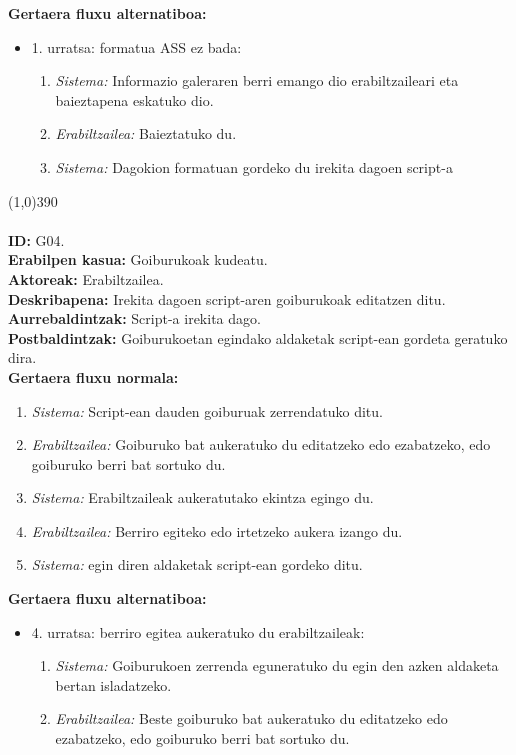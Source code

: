 \textbf{Gertaera fluxu alternatiboa:}
\begin{itemize}
	\item 1. urratsa: formatua ASS ez bada:
		\begin{enumerate}
		\item \textit{Sistema:} Informazio galeraren berri emango dio erabiltzaileari eta baieztapena eskatuko dio.
		\item \textit{Erabiltzailea:} Baieztatuko du.
		\item \textit{Sistema:} Dagokion formatuan gordeko du irekita dagoen script-a
		\end{enumerate}
\end{itemize}
\line(1,0){390}\\




\noindent\\
\textbf{ID:} G04.\\
\textbf{Erabilpen kasua:} Goiburukoak kudeatu.\\
\textbf{Aktoreak:} Erabiltzailea.\\
\textbf{Deskribapena:} Irekita dagoen script-aren goiburukoak editatzen ditu.\\
\textbf{Aurrebaldintzak:} Script-a irekita dago.\\
\textbf{Postbaldintzak:} Goiburukoetan egindako aldaketak script-ean gordeta geratuko dira.\\
\textbf{Gertaera fluxu normala:}
\begin{enumerate}
	\item \textit{Sistema:} Script-ean dauden goiburuak zerrendatuko ditu.
	\item \textit{Erabiltzailea:} Goiburuko bat aukeratuko du editatzeko edo ezabatzeko, edo goiburuko berri bat sortuko du.
	\item \textit{Sistema:} Erabiltzaileak aukeratutako ekintza egingo du.
	\item \textit{Erabiltzailea:} Berriro egiteko edo irtetzeko aukera izango du.
	\item \textit{Sistema:} egin diren aldaketak script-ean gordeko ditu.
\end{enumerate}
\textbf{Gertaera fluxu alternatiboa:}
\begin{itemize}
	\item 4. urratsa: berriro egitea aukeratuko du erabiltzaileak:
		\begin{enumerate}
		\item \textit{Sistema:} Goiburukoen zerrenda eguneratuko du egin den azken aldaketa bertan isladatzeko.
		\item \textit{Erabiltzailea:} Beste goiburuko bat aukeratuko du editatzeko edo ezabatzeko, edo goiburuko berri bat sortuko du.
		\end{enumerate}
\end{itemize}

